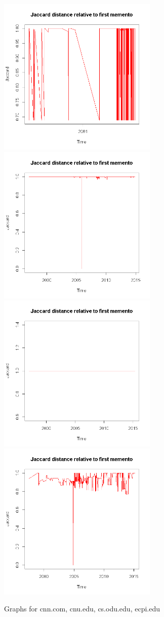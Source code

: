 \documentclass[12pt]{article} %
\begin{document}
\begin{figure}
\includegraphics[width=3in]{cnn-graph.png}
\includegraphics[width=3in]{cnu-graph.png}
\includegraphics[width=3in]{cs-odu.png}
\includegraphics[width=3in]{ecpi-graph.png}
\caption{Graphs for cnn.com, cnu.edu, cs.odu.edu, ecpi.edu}
\end{figure}
\end{document}
